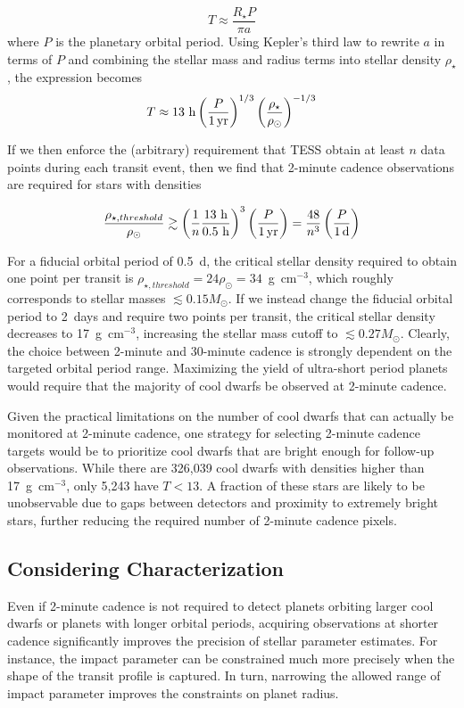 \documentclass[twocolumn]{aastex62}
\begin{document}
\begin{equation}
T \approx \frac{R_\star P}{\pi a}
\end{equation}
where $P$ is the planetary orbital period. Using Kepler's third law to rewrite $a$ in terms of $P$ and combining the stellar mass and radius terms into stellar density $\rho_\star$, the expression becomes
\begin{equation}
T \approx 13~{\rm h}\left(\frac{P}{\rm 1\, yr}\right)^{1/3}\left(\frac{\rho_\star}{\rho_\odot}\right)^{-1/3}
\label{eq:duration}
\end{equation}

If we then enforce the (arbitrary) requirement that TESS obtain at least $n$ data points during each transit event, then we find that 2-minute cadence observations are required for stars with densities 

\begin{equation}
\frac{\rho_{\star,threshold}}{\rho_\odot} \gtrsim  \left(\frac{1}{n} \frac{13~{\rm h}}{0.5~{\rm h}}\right)^3 \left(\frac{P}{\rm 1\, yr}\right) = \frac{48}{n^3}\left(\frac{P}{\rm 1\, d}\right)
\end{equation}

For a fiducial orbital period of 0.5~d, the critical stellar density required to obtain one point per transit is $\rho_{\star,threshold} = 24\rho_\odot = 34$~g~cm$^{-3}$, which roughly corresponds to stellar masses $\lesssim 0.15M_\odot$. If we instead change the fiducial orbital period to 2~days and require two points per transit, the critical stellar density decreases to 17~g~cm$^{-3}$, increasing the stellar mass cutoff to $\lesssim 0.27 M_\odot$. Clearly, the choice between 2-minute and 30-minute cadence is strongly dependent on the targeted orbital period range. Maximizing the yield of ultra-short period planets would require that the majority of cool dwarfs be observed at 2-minute cadence.

Given the practical limitations on the number of cool dwarfs that can actually be monitored at 2-minute cadence, one strategy for selecting 2-minute cadence targets would be to prioritize cool dwarfs that are bright enough for follow-up observations. While there are 326,039 cool dwarfs with densities higher than 17~g~cm$^{-3}$, only 5,243 have $T < 13$. A fraction of these stars are likely to be unobservable due to gaps between detectors and proximity to extremely bright stars, further reducing the required number of 2-minute cadence pixels.

\subsection{Considering Characterization}
Even if 2-minute cadence is not required to detect planets orbiting larger cool dwarfs or planets with longer orbital periods, acquiring observations at shorter cadence significantly improves the precision of stellar parameter estimates. For instance, the impact parameter can be constrained much more precisely when the shape of the transit profile is captured. In turn, narrowing the allowed range of impact parameter improves the constraints on planet radius. 
\end{document}
